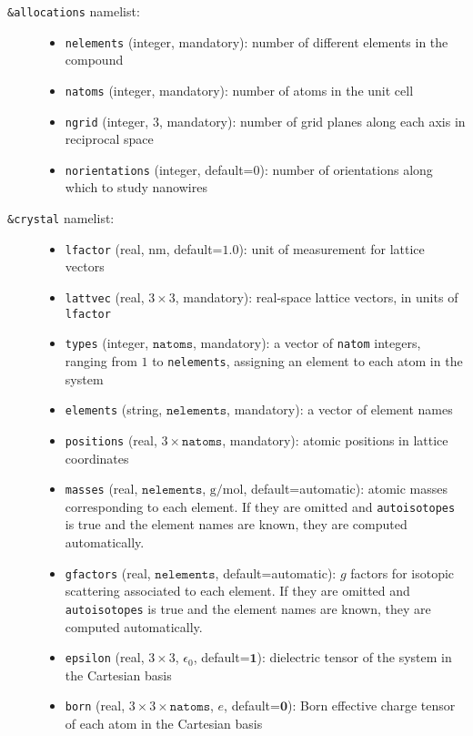 \documentclass[a4paper,10pt,english]{article}
\begin{document}
\begin{description}
\item[\texttt{\&allocations} namelist:]\hfill
  \begin{itemize}
    \item\texttt{nelements} (integer, mandatory): number of different elements in the compound
    \item\texttt{natoms} (integer, mandatory): number of atoms in the unit cell
    \item\texttt{ngrid} (integer, $3$, mandatory): number of grid planes along each axis in reciprocal space
    \item\texttt{norientations} (integer, default=0): number of orientations along which to study nanowires
  \end{itemize}
\item[\texttt{\&crystal} namelist:]\hfill
  \begin{itemize}
  \item\texttt{lfactor} (real, $\mathrm{nm}$, default=$1.0$): unit of measurement for lattice vectors
  \item\texttt{lattvec} (real, $3\times 3$, mandatory): real-space lattice vectors, in units of \texttt{lfactor}
  \item\texttt{types} (integer, $\mathtt{natoms}$, mandatory): a vector of \texttt{natom} integers, ranging from $1$ to \texttt{nelements}, assigning an element to each atom in the system
  \item\texttt{elements} (string, $\mathtt{nelements}$, mandatory): a vector of element names
  \item\texttt{positions} (real, $3\times \mathtt{natoms}$, mandatory): atomic positions in lattice coordinates
  \item\texttt{masses} (real, $\mathtt{nelements}$, $\mathrm{g/mol}$, default=automatic): atomic masses corresponding to each element. If they are omitted and \texttt{autoisotopes} is true and the element names are known, they are computed automatically.
  \item\texttt{gfactors} (real, $\mathtt{nelements}$, default=automatic): $g$ factors for isotopic scattering associated to each element. If they are omitted and \texttt{autoisotopes} is true and the element names are known, they are computed automatically.
  \item\texttt{epsilon} (real, $3\times 3$, $\epsilon_0$, default=$\mathbf{1}$): dielectric tensor of the system in the Cartesian basis
  \item\texttt{born} (real, $3\times 3\times\mathtt{natoms}$, $e$, default=$\mathbf{0}$): Born effective charge tensor of each atom in the Cartesian basis

\end{itemize}
\end{description}
\end{document}
